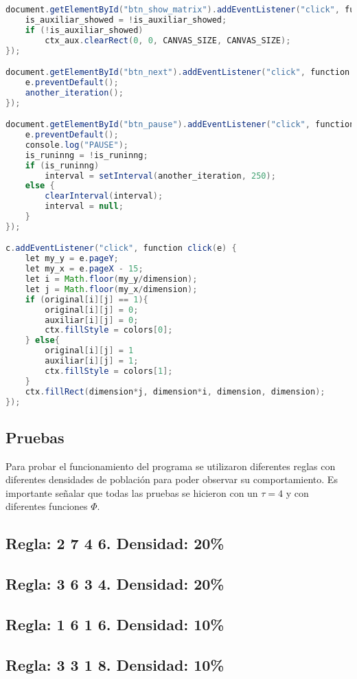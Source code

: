 \documentclass[a4paper,12pt]{article}
\begin{document}
\begin{lstlisting}[language=Java]
document.getElementById("btn_show_matrix").addEventListener("click", function click(e) {
    is_auxiliar_showed = !is_auxiliar_showed;
    if (!is_auxiliar_showed)
        ctx_aux.clearRect(0, 0, CANVAS_SIZE, CANVAS_SIZE);
});

document.getElementById("btn_next").addEventListener("click", function click(e) {
    e.preventDefault();
    another_iteration();
});

document.getElementById("btn_pause").addEventListener("click", function click(e) {
    e.preventDefault();
    console.log("PAUSE");
    is_runinng = !is_runinng;
    if (is_runinng)
        interval = setInterval(another_iteration, 250);
    else {
        clearInterval(interval);
        interval = null;
    }
});

c.addEventListener("click", function click(e) {
    let my_y = e.pageY;
    let my_x = e.pageX - 15;
    let i = Math.floor(my_y/dimension);
    let j = Math.floor(my_x/dimension);
    if (original[i][j] == 1){
        original[i][j] = 0;
        auxiliar[i][j] = 0;
        ctx.fillStyle = colors[0];
    } else{
        original[i][j] = 1
        auxiliar[i][j] = 1;
        ctx.fillStyle = colors[1];
    }
    ctx.fillRect(dimension*j, dimension*i, dimension, dimension);
});
\end{lstlisting}

\subsection{Pruebas}
Para probar el funcionamiento del programa se utilizaron diferentes reglas con diferentes densidades de población para poder observar su comportamiento. Es importante señalar que todas las pruebas se hicieron con un $\tau=4$ y con diferentes funciones $\Phi$.

\subsection{Regla: 2 7 4 6. Densidad: 20\%} 
\subsection{Regla: 3 6 3 4. Densidad: 20\%}
\subsection{Regla: 1 6 1 6. Densidad: 10\%}
\subsection{Regla: 3 3 1 8. Densidad: 10\%}
\end{document}
